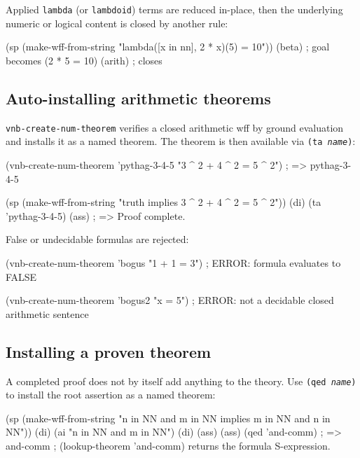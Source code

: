 Applied \texttt{lambda} (or \texttt{lambdoid}) terms are reduced
in-place, then the underlying numeric or logical content is closed
by another rule:

\begin{VNBcode}
(sp (make-wff-from-string "lambda([x in nn], 2 * x)(5) = 10"))
(beta)   ; goal becomes (2 * 5 = 10)
(arith)  ; closes
\end{VNBcode}

\subsection{Auto-installing arithmetic theorems}

\texttt{vnb-create-num-theorem} verifies a closed arithmetic wff by
ground evaluation and installs it as a named theorem.  The theorem is
then available via \texttt{(ta \textit{name})}:

\begin{VNBcode}
(vnb-create-num-theorem 'pythag-3-4-5 "3 ^ 2 + 4 ^ 2 = 5 ^ 2")
; => pythag-3-4-5

(sp (make-wff-from-string "truth implies 3 ^ 2 + 4 ^ 2 = 5 ^ 2"))
(di) (ta 'pythag-3-4-5) (ass)
; => Proof complete.
\end{VNBcode}

False or undecidable formulas are rejected:

\begin{VNBcode}
(vnb-create-num-theorem 'bogus "1 + 1 = 3")
; ERROR: formula evaluates to FALSE

(vnb-create-num-theorem 'bogus2 "x = 5")
; ERROR: not a decidable closed arithmetic sentence
\end{VNBcode}

\subsection{Installing a proven theorem}
\label{sec:qed-and-subst}

A completed proof does not by itself add anything to the theory.  Use
\texttt{(qed \textit{name})} to install the root assertion as a named
theorem:

\begin{VNBcode}
(sp (make-wff-from-string "n in NN and m in NN implies m in NN and n in NN"))
(di) (ai "n in NN and m in NN") (di) (ass) (ass)
(qed 'and-comm)
; => and-comm
; (lookup-theorem 'and-comm) returns the formula S-expression.
\end{VNBcode}

